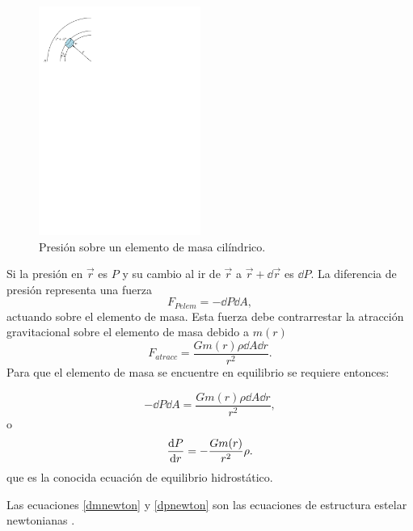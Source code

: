 \begin{figure}[H]
    \centering
    \includegraphics[width=150pt]{figures/stellarnewton.pdf}
    \caption{Presión sobre un elemento de masa cilíndrico.}
    \label{stellnew}
\end{figure}
Si la presión en $\vec{r}$ es $P$ y su cambio al ir de $\vec{r}$ a $\vec{r}+\dd{\vec{r}}$ es $\dd{P}$. La diferencia de presión representa una fuerza 
\begin{equation*}
    F_{Pelem}=-\dd{P}\dd{A},
\end{equation*}
actuando sobre el elemento de masa. Esta fuerza debe contrarrestar la atracción gravitacional sobre el elemento de masa debido a $m(r)$
\begin{equation*}
    F_{atracc}=\frac{G m(r)\rho \dd{A} \dd{r}}{r^2}.
\end{equation*}
Para que el elemento de masa se encuentre en equilibrio se requiere entonces:

\begin{equation}
    -\dd{P}\dd{A} =\frac{G m(r)\rho \dd{A} \dd{r}}{r^2},
\end{equation}
o
\begin{equation}
    \dv{P}{r} = - \frac { G m ( r ) } { r ^ { 2 } } \rho.
    \label{dpnewton}
\end{equation}
que es la conocida ecuación de equilibrio hidrostático. 

Las ecuaciones \eqref{dmnewton} y \eqref{dpnewton} son las ecuaciones de estructura estelar newtonianas \cite{Chandrasekhar1958}. 


